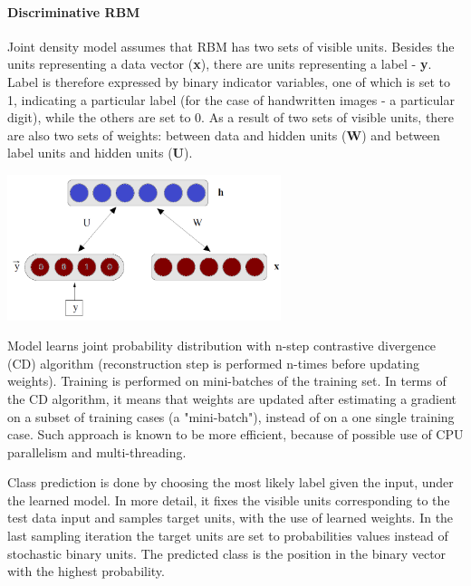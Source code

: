 \documentclass[a4paper]{scrartcl}
\begin{document}
\paragraph{Discriminative RBM}
Joint density model assumes that RBM has two sets of visible units. Besides the units representing a data vector ({\bfseries x}), there are units representing a label - {\bfseries y}. Label is therefore expressed by binary indicator variables, one of which is set to 1, indicating a particular label (for the case of handwritten images - a particular digit), while the others are set to 0. 
As a result of two sets of visible units, there are also two sets of weights: between data and hidden units ({\bfseries W}) and between label units and hidden units ({\bfseries U}). 
\begin{center}
\includegraphics[width=8cm]{images/jointProbModel.png}
\end{center}
Model learns joint probability distribution with n-step contrastive divergence (CD) algorithm (reconstruction step is performed n-times before updating weights). Training is performed on mini-batches of the training set. In terms of the CD algorithm, it means that weights are updated after estimating a gradient on a subset of training cases (a "mini-batch"), instead of on a one single training case. Such approach is known to be more efficient, because of possible use of CPU parallelism and multi-threading.
\par Class prediction is done by choosing the most likely label given the input, under the learned model. In more detail, it fixes the visible units corresponding to the test data input and samples target units, with the use of learned weights. In the last sampling iteration the target units are set to probabilities values instead of stochastic binary units. The predicted class is the position in the binary vector with the highest probability. 
\end{document}
